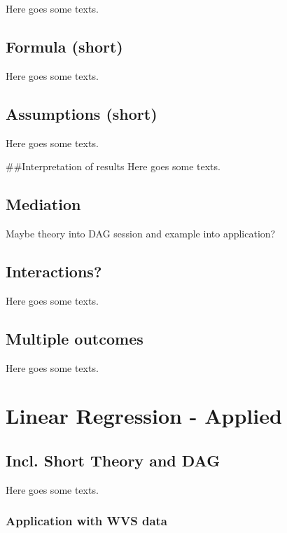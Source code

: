 \documentclass[
]{book}
\begin{document}
Here goes some texts.

\hypertarget{formula-short}{%
\section{Formula (short)}\label{formula-short}}

Here goes some texts.

\hypertarget{assumptions-short}{%
\section{Assumptions (short)}\label{assumptions-short}}

Here goes some texts.

\#\#Interpretation of results
Here goes some texts.

\hypertarget{mediation}{%
\section{Mediation}\label{mediation}}

Maybe theory into DAG session and example into application?

\hypertarget{interactions}{%
\section{Interactions?}\label{interactions}}

Here goes some texts.

\hypertarget{multiple-outcomes}{%
\section{Multiple outcomes}\label{multiple-outcomes}}

Here goes some texts.

\hypertarget{lin-a}{%
\chapter{Linear Regression - Applied}\label{lin-a}}

\hypertarget{incl.-short-theory-and-dag}{%
\section{Incl. Short Theory and DAG}\label{incl.-short-theory-and-dag}}

Here goes some texts.

\hypertarget{application-with-wvs-data}{%
\subsection{Application with WVS data}\label{application-with-wvs-data}}
\end{document}
